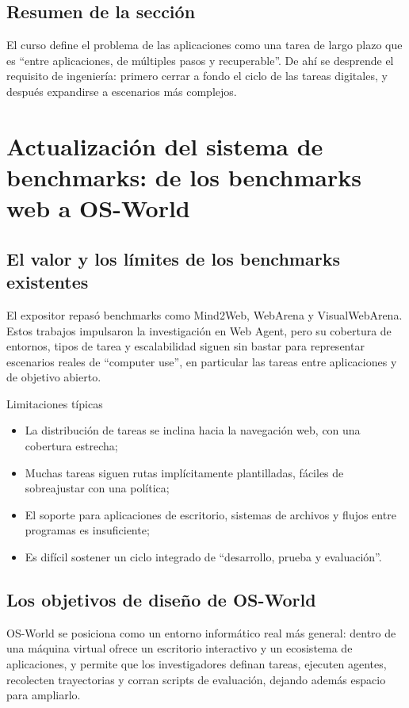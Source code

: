 \documentclass[a4paper]{article}
\begin{document}
\subsection{Resumen de la sección}
El curso define el problema de las aplicaciones como una tarea de largo plazo que es ``entre aplicaciones, de múltiples pasos y recuperable''. De ahí se desprende el requisito de ingeniería: primero cerrar a fondo el ciclo de las tareas digitales, y después expandirse a escenarios más complejos.

\section{Actualización del sistema de benchmarks: de los benchmarks web a OS-World}

\subsection{El valor y los límites de los benchmarks existentes}
El expositor repasó benchmarks como Mind2Web, WebArena y VisualWebArena. Estos trabajos impulsaron la investigación en Web Agent, pero su cobertura de entornos, tipos de tarea y escalabilidad siguen sin bastar para representar escenarios reales de ``computer use'', en particular las tareas entre aplicaciones y de objetivo abierto.

\begin{knowledgebox}{Limitaciones típicas}
\begin{itemize}
    \item La distribución de tareas se inclina hacia la navegación web, con una cobertura estrecha;
    \item Muchas tareas siguen rutas implícitamente plantilladas, fáciles de sobreajustar con una política;
    \item El soporte para aplicaciones de escritorio, sistemas de archivos y flujos entre programas es insuficiente;
    \item Es difícil sostener un ciclo integrado de ``desarrollo, prueba y evaluación''.
\end{itemize}
\end{knowledgebox}

\subsection{Los objetivos de diseño de OS-World}
OS-World se posiciona como un entorno informático real más general: dentro de una máquina virtual ofrece un escritorio interactivo y un ecosistema de aplicaciones, y permite que los investigadores definan tareas, ejecuten agentes, recolecten trayectorias y corran scripts de evaluación, dejando además espacio para ampliarlo.
\end{document}
